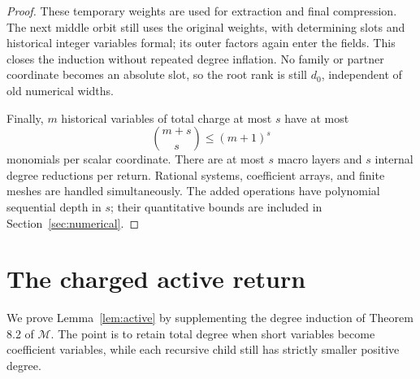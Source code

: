 \documentclass[11pt,a4paper]{article}
\theoremstyle{definition}
\newcommand{\M}{\mathcal M}
\begin{document}
\begin{proof}
These temporary weights are used for extraction and final
compression. The next middle orbit still uses the original
weights, with determining slots and historical integer variables
formal; its outer factors again enter the fields. This closes
the induction without repeated degree inflation. No family or
partner coordinate becomes an absolute slot, so the root rank
is still \(d_0\), independent of old numerical widths.

Finally, \(m\) historical variables of total charge at most \(s\)
have at most
\[
 \binom{m+s}{s}\le(m+1)^s
\]
monomials per scalar coordinate. There are at most \(s\) macro
layers and \(s\) internal degree reductions per return.
Rational systems, coefficient arrays, and finite meshes are
handled simultaneously. The added operations have polynomial
sequential depth in \(s\); their quantitative bounds are included
in Section~\ref{sec:numerical}.
\end{proof}

\section{The charged active return}\label{sec:active}

We prove Lemma~\ref{lem:active} by supplementing the degree induction
of Theorem 8.2 of \(\M\). The point is to retain total degree when
short variables become coefficient variables, while each recursive
child still has strictly smaller positive degree.
\end{document}
